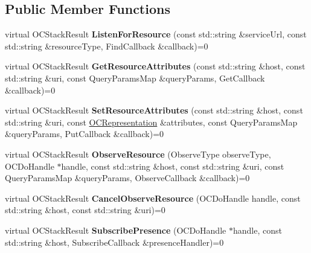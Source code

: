 \subsection*{Public Member Functions}
\begin{DoxyCompactItemize}
\item 
\hypertarget{classOC_1_1IClientWrapper_ad012eafe311711ae5a33ebe0d41c3f09}{}virtual O\+C\+Stack\+Result {\bfseries Listen\+For\+Resource} (const std\+::string \&service\+Url, const std\+::string \&resource\+Type, Find\+Callback \&callback)=0\label{classOC_1_1IClientWrapper_ad012eafe311711ae5a33ebe0d41c3f09}

\item 
\hypertarget{classOC_1_1IClientWrapper_abefeeea923fed4f9d6bb83fe0d1c8a1e}{}virtual O\+C\+Stack\+Result {\bfseries Get\+Resource\+Attributes} (const std\+::string \&host, const std\+::string \&uri, const Query\+Params\+Map \&query\+Params, Get\+Callback \&callback)=0\label{classOC_1_1IClientWrapper_abefeeea923fed4f9d6bb83fe0d1c8a1e}

\item 
\hypertarget{classOC_1_1IClientWrapper_ad55c3e80b33822504dcbb98139655a34}{}virtual O\+C\+Stack\+Result {\bfseries Set\+Resource\+Attributes} (const std\+::string \&host, const std\+::string \&uri, const \hyperlink{classOC_1_1OCRepresentation}{O\+C\+Representation} \&attributes, const Query\+Params\+Map \&query\+Params, Put\+Callback \&callback)=0\label{classOC_1_1IClientWrapper_ad55c3e80b33822504dcbb98139655a34}

\item 
\hypertarget{classOC_1_1IClientWrapper_a64334f436fb263f50e07a54908f468af}{}virtual O\+C\+Stack\+Result {\bfseries Observe\+Resource} (Observe\+Type observe\+Type, O\+C\+Do\+Handle $\ast$handle, const std\+::string \&host, const std\+::string \&uri, const Query\+Params\+Map \&query\+Params, Observe\+Callback \&callback)=0\label{classOC_1_1IClientWrapper_a64334f436fb263f50e07a54908f468af}

\item 
\hypertarget{classOC_1_1IClientWrapper_a1404240f1bd3efb05f0fbed032fe5a78}{}virtual O\+C\+Stack\+Result {\bfseries Cancel\+Observe\+Resource} (O\+C\+Do\+Handle handle, const std\+::string \&host, const std\+::string \&uri)=0\label{classOC_1_1IClientWrapper_a1404240f1bd3efb05f0fbed032fe5a78}

\item 
\hypertarget{classOC_1_1IClientWrapper_ac9e687574a99db40ce773f0f7ff1d067}{}virtual O\+C\+Stack\+Result {\bfseries Subscribe\+Presence} (O\+C\+Do\+Handle $\ast$handle, const std\+::string \&host, Subscribe\+Callback \&presence\+Handler)=0\label{classOC_1_1IClientWrapper_ac9e687574a99db40ce773f0f7ff1d067}


\end{DoxyCompactItemize}
